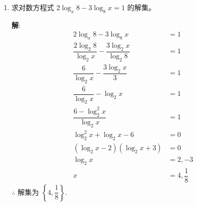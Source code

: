 \documentclass{report}
\newcommand{\sol}{\vspace{0.2cm}\textbf{解}:}
\begin{document}
\begin{multicols*}{2}
\begin{enumerate}[leftmargin=*]
              \sol{}
              \begin{align*}
                  \log_2 x + \log_8 x            & = 2 \log_2 x \cdot \log_8 x            \\
                  \log_2 x + \dfrac{\log_2 x}{3} & = 2 \log_2 x \cdot \dfrac{\log_2 x}{3}
              \end{align*}
              设 $y = \log_2 x$, 则
              \begin{align*}
                  y + \dfrac{y}{3} & = 2y \cdot \dfrac{y}{3} \\
                  y + \dfrac{y}{3} & = \dfrac{2y^2}{3}       \\
                  3y + y           & = 2y^2                  \\
                  y^2 - 2y         & = 0                     \\
                  y(y - 2)         & = 0                     \\
                  y                & = 0, 2
              \end{align*}
              当 $y = 0$ 时, $x = 1$; 当 $y = 2$ 时, $x = 4$.

        \item 求对数方程式 $2 \log _x 8-3 \log _8 x=1$ 的解集。

              \sol{}
              \begin{align*}
                  2 \log_x 8 - 3 \log_8 x                                     & = 1               \\
                  \dfrac{2 \log_2 8}{\log_2 x} - \dfrac{3 \log_2 x}{\log_2 8} & = 1               \\
                  \dfrac{6}{\log_2 x} - \dfrac{3 \log_2 x}{3}                 & = 1               \\
                  \dfrac{6}{\log_2 x} - \log_2 x                              & = 1               \\
                  \dfrac{6 - \log_2^2 x}{\log_2 x}                            & = 1               \\
                  \log_2^2 x + \log_2 x - 6                                   & = 0               \\
                  (\log_2 x - 2)(\log_2 x + 3)                                & = 0               \\
                  \log_2 x                                                    & = 2, -3           \\
                  x                                                           & = 4, \dfrac{1}{8}
              \end{align*}
              $\therefore$ 解集为 $\left\{4, \dfrac{1}{8}\right\}$.


\end{enumerate}
\end{multicols*}
\end{document}
